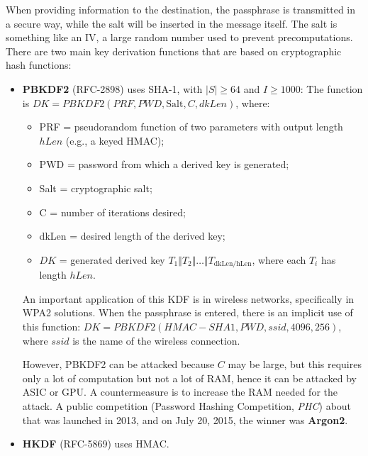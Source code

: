 When providing information to the destination, the passphrase is transmitted in a secure way, while the salt will be inserted in the message itself. The salt is something like an IV, a large random number used to prevent precomputations.
There are two main key derivation functions that are based on cryptographic hash functions:

\begin{itemize}
    \item \textbf{PBKDF2} (RFC-2898) uses SHA-1, with \(|S| \geq 64\) and \(I \geq 1000\):
          The function is \(DK = PBKDF2(PRF, PWD, \text{Salt}, C, dkLen)\), where:
          \begin{itemize}
              \item PRF = pseudorandom function of two parameters with output length \(hLen\) (e.g., a keyed HMAC);
              \item PWD = password from which a derived key is generated;
              \item Salt = cryptographic salt;
              \item C = number of iterations desired;
              \item dkLen = desired length of the derived key;
              \item \(DK\) = generated derived key $T_1 \Vert T_2 \Vert \ldots \Vert T_{\text{dkLen/hLen}}$, where each $T_i$ has length \(hLen\).
          \end{itemize}
          An important application of this KDF is in wireless networks, specifically in WPA2 solutions. When the passphrase is entered, there is an implicit use of this function: $DK = PBKDF2(HMAC-SHA1, PWD, ssid, 4096, 256)$, where \(ssid\) is the name of the wireless connection.

          However, PBKDF2 can be attacked because \(C\) may be large, but this requires only a lot of computation but not a lot of RAM, hence it can be attacked by ASIC or GPU. A countermeasure is to increase the RAM needed for the attack. A public competition (Password Hashing Competition, \textit{PHC}) about that was launched in 2013, and on July 20, 2015, the winner was \textbf{Argon2}.

    \item \textbf{HKDF} (RFC-5869) uses HMAC.
\end{itemize}


